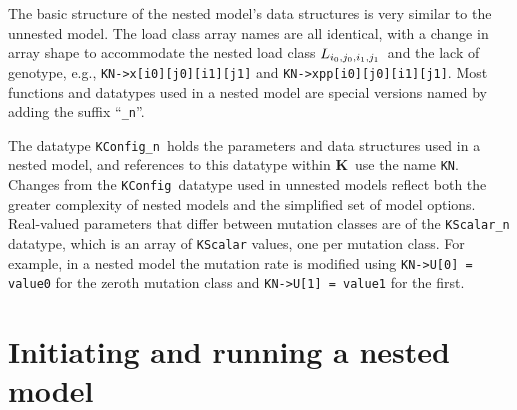 \documentclass[10pt,twoside,a4paper,fleqn]{report}
\numberwithin{equation}{section}  %
\newcommand{\K}{{\bf K}}
\newcommand{\KKN}{\mbox{{\tt KN}}}  %
\newcommand{\KConfig}{\mbox{\tt KConfig}}
\newcommand{\KConfign}{\mbox{\tt KConfig\_n}}
\newcommand{\Lijij}{\mbox{$L_{i_0\/,j_0\/,i_1\/,j_1\/}$}}
\begin{document}
{The basic structure of the nested model's data structures is very similar to the unnested model.  The load class array names are all identical, with a change in array shape to accommodate the nested load class \Lijij\ and the lack of genotype, e.g., \lstinline{KN->x[i0][j0][i1][j1]} and \lstinline{KN->xpp[i0][j0][i1][j1]}.  Most functions and datatypes used in a nested model are special versions named by adding the suffix ``\lstinline{_n}''. 

The datatype \KConfign\ holds the parameters and data structures used in a nested model, and references to this datatype within \K\ use the name \KKN.  Changes from the \KConfig\ datatype used in unnested models reflect both the greater complexity of nested models and the simplified set of model options.
Real-valued parameters that differ between mutation classes are of the \lstinline{KScalar_n} datatype, which is an array of \lstinline{KScalar} values, one per mutation class.  For example, in a nested model the mutation rate is modified using \lstinline{KN->U[0] = value0} for the zeroth mutation class and \lstinline{KN->U[1] = value1} for the first.

\section{Initiating and running a nested model}

}
\end{document}
